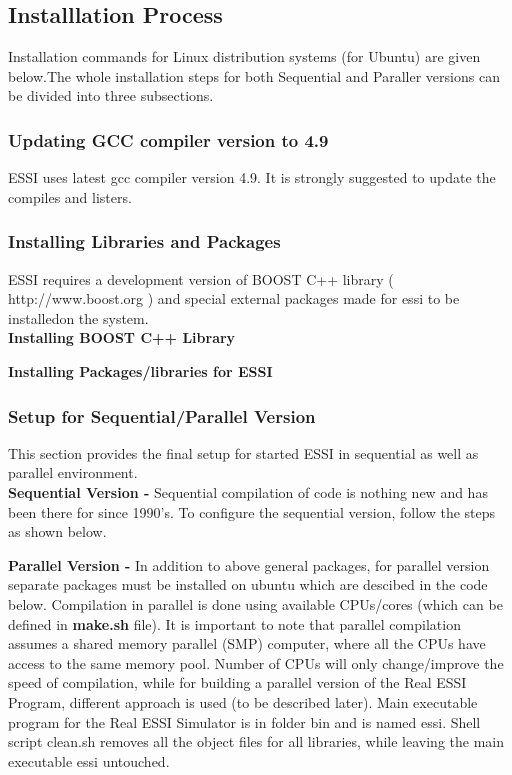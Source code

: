\documentclass{article}
\begin{document}
\subsection{Installlation Process}
Installation commands for Linux distribution systems (for Ubuntu) are given below.The whole installation steps for both Sequential and Paraller versions can be divided into three subsections. 

\subsubsection{Updating GCC compiler version to 4.9}
ESSI uses latest gcc compiler version 4.9. It is strongly suggested to update the compiles and listers.



\subsubsection{Installing Libraries and Packages}
ESSI requires a development version of BOOST C++ library ( http://www.boost.org ) and special external packages made for essi to be installedon the system.\\

\textbf{Installing BOOST C++ Library}  



\textbf{Installing Packages/libraries for ESSI}  



\subsubsection{Setup for Sequential/Parallel Version}
This section provides the final setup for started ESSI in sequential as well as parallel environment.\\

\textbf{Sequential Version - }
Sequential compilation of code is nothing new and has been there for since 1990's. To configure the sequential version, follow the steps as shown below.



\textbf{Parallel Version - }
In addition to above general packages, for parallel version separate packages must be installed on ubuntu which are descibed in the code below. Compilation in parallel is done using available CPUs/cores (which can be defined in \textbf{make.sh} file). It is important to note that parallel compilation assumes a shared memory parallel (SMP) computer, where all the CPUs have access to the same memory pool. Number of CPUs will only change/improve the speed of compilation, while for building a parallel version of the Real ESSI Program, different approach is used (to be described later). Main executable program for the Real ESSI Simulator is in folder bin and is named essi. Shell script clean.sh removes all the object files for all libraries, while leaving the main executable essi untouched.
\end{document}
